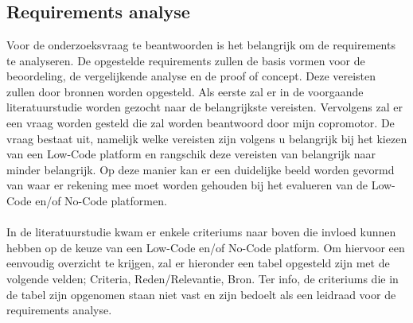 
\chapter{}%
\label{ch:methodologie}


\section*{Requirements analyse}
\label{sec:requirements-analyse}
Voor de onderzoeksvraag te beantwoorden is het belangrijk 
om de requirements te analyseren. De opgestelde requirements zullen de basis vormen voor de beoordeling, de vergelijkende analyse en de proof of concept.
 Deze vereisten zullen door bronnen worden opgesteld. Als eerste
  zal er in de voorgaande literatuurstudie worden gezocht naar de belangrijkste vereisten. Vervolgens zal er een vraag
   worden gesteld die zal worden beantwoord door mijn copromotor. De vraag bestaat uit, namelijk welke vereisten zijn volgens u belangrijk bij het kiezen van een 
   Low-Code platform en rangschik deze vereisten van belangrijk naar minder belangrijk. Op deze manier kan er een duidelijke beeld worden gevormd van waar er 
   rekening mee moet worden gehouden bij het evalueren van de Low-Code en/of No-Code platformen.
\\
\\
In de literatuurstudie kwam er enkele criteriums naar boven die invloed kunnen hebben op 
de keuze van een Low-Code en/of No-Code platform. Om hiervoor een eenvoudig 
overzicht te krijgen, zal er hieronder een tabel opgesteld zijn met de volgende velden; 
Criteria, Reden/Relevantie, Bron. Ter info, de criteriums die in de tabel zijn opgenomen 
staan niet vast en zijn bedoelt als een leidraad voor de requirements analyse.
\\
\\


